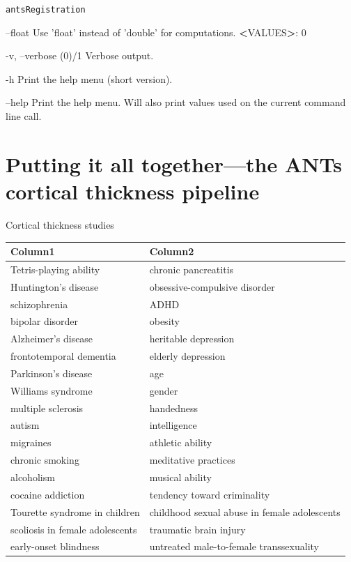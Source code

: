 \documentclass[ignorenonframetext,]{beamer}
\newenvironment{Shaded}{\begin{snugshade}}{\end{snugshade}}
\newcommand{\StringTok}[1]{\textcolor[rgb]{0.31,0.60,0.02}{#1}}
\newcommand{\OperatorTok}[1]{\textcolor[rgb]{0.81,0.36,0.00}{\textbf{#1}}}
\newcommand{\ExtensionTok}[1]{#1}
\newcommand{\NormalTok}[1]{#1}
\begin{document}
\begin{frame}[fragile]{\texttt{antsRegistration}}
\begin{Shaded}
\begin{Highlighting}[]
     \ExtensionTok{--float}
          \ExtensionTok{Use} \StringTok{'float'}\NormalTok{ instead of }\StringTok{'double'}\NormalTok{ for computations.}
          \OperatorTok{<}\ExtensionTok{VALUES}\OperatorTok{>}\NormalTok{: 0}

     \ExtensionTok{-v}\NormalTok{, --verbose (0)}\ExtensionTok{/1}
          \ExtensionTok{Verbose}\NormalTok{ output.}

     \ExtensionTok{-h}
          \ExtensionTok{Print}\NormalTok{ the help menu (short version)}\ExtensionTok{.}

     \ExtensionTok{--help}
          \ExtensionTok{Print}\NormalTok{ the help menu. Will also print values used on the current command line}
          \ExtensionTok{call.}
\end{Highlighting}
\end{Shaded}

\end{frame}

\section{Putting it all together---the ANTs cortical thickness
pipeline}\label{putting-it-all-togetherthe-ants-cortical-thickness-pipeline}

\begin{frame}{Cortical thickness studies}

\scriptsize

\begin{longtable}[]{@{}ll@{}}
\toprule
Column1 & Column2\tabularnewline
\midrule
\endhead
Tetris-playing ability & chronic pancreatitis\tabularnewline
Huntington's disease & obsessive-compulsive disorder\tabularnewline
schizophrenia & ADHD\tabularnewline
bipolar disorder & obesity\tabularnewline
Alzheimer's disease & heritable depression\tabularnewline
frontotemporal dementia & elderly depression\tabularnewline
Parkinson's disease & age\tabularnewline
Williams syndrome & gender\tabularnewline
multiple sclerosis & handedness\tabularnewline
autism & intelligence\tabularnewline
migraines & athletic ability\tabularnewline
chronic smoking & meditative practices\tabularnewline
alcoholism & musical ability\tabularnewline
cocaine addiction & tendency toward criminality\tabularnewline
Tourette syndrome in children & childhood sexual abuse in female
adolescents\tabularnewline
scoliosis in female adolescents & traumatic brain injury\tabularnewline
early-onset blindness & untreated male-to-female
transsexuality\tabularnewline
\bottomrule
\end{longtable}

\end{frame}
\end{document}
